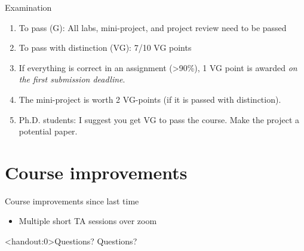 \documentclass[10pt,handout]{beamer}
\begin{document}
\begin{frame}{Examination}

\begin{enumerate}
\item To pass (G): All labs, mini-project, and project review need to be passed\pause
\item To pass with distinction (VG): 7/10 VG points\pause
\item If everything is correct in an assignment (>90\%), 1 VG point is awarded \emph{on the first submission deadline}.\pause
\item The mini-project is worth 2 VG-points (if it is passed with distinction).
\item Ph.D. students: I suggest you get VG to pass the course. Make the project a potential paper.
\end{enumerate}

\end{frame}

\section{Course improvements}
\frame{\sectionpage}

\begin{frame}{Course improvements since last time}

\begin{itemize}
\item Multiple short TA sessions over zoom
\end{itemize}

\end{frame}

\begin{frame}<handout:0>{Questions?}
Questions?
\end{frame}

\end{document}
